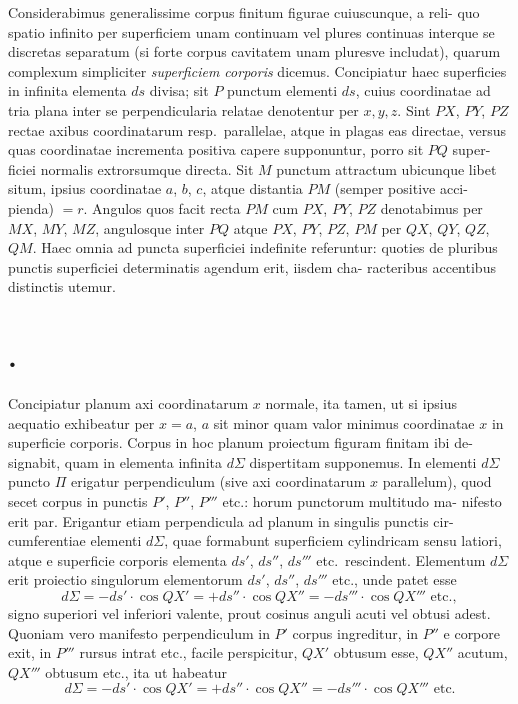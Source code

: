 \documentclass[12pt,a4paper]{article}
\theoremstyle{gauss}
\begin{document}
Considerabimus generalissime corpus finitum figurae cuiuscunque, a reli-
quo spatio infinito per superficiem unam continuam vel plures continuas interque
se discretas separatum (si forte corpus cavitatem unam pluresve includat), quarum
complexum simpliciter \emph{superficiem corporis} dicemus. Concipiatur haec superficies
in infinita elementa $ds$ divisa; sit $P$ punctum elementi $ds$, cuius coordinatae ad
tria plana inter se perpendicularia relatae denotentur per $x,y,z$. Sint $PX$, $PY$, $PZ$
rectae axibus coordinatarum resp.~parallelae, atque in plagas eas directae, versus
quas coordinatae incrementa positiva capere supponuntur, porro sit $PQ$ super-
ficiei normalis extrorsumque directa. Sit $M$ punctum attractum ubicunque libet
situm, ipsius coordinatae $a$, $b$, $c$, atque distantia $PM$ (semper positive acci-
pienda) $=r$. Angulos quos facit recta $PM$ cum $PX$, $PY$, $PZ$ denotabimus
per $MX$, $MY$, $MZ$, angulosque inter $PQ$ atque $PX$, $PY$, $PZ$, $PM$ per
$QX$, $QY$, $QZ$, $QM$. Haec omnia ad puncta superficiei indefinite referuntur:
quoties de pluribus punctis superficiei determinatis agendum erit, iisdem cha-
racteribus accentibus distinctis utemur.

\section*{%
%
\thesection.}

Concipiatur planum axi coordinatarum $x$ normale, ita tamen, ut si ipsius
aequatio exhibeatur per $x=a$, $a$ sit minor quam valor minimus coordinatae $x$
in superficie corporis. Corpus in hoc planum proiectum figuram finitam ibi de-
signabit, quam in elementa infinita $d\Sigma$ dispertitam supponemus. In elementi
$d\Sigma$ puncto $\Pi$ erigatur perpendiculum (sive axi coordinatarum $x$ parallelum),
quod secet corpus in punctis $P'$, $P''$, $P'''$ etc.: horum punctorum multitudo ma-
nifesto erit par. Erigantur etiam perpendicula ad planum in singulis punctis cir-
cumferentiae elementi $d\Sigma$, quae formabunt superficiem cylindricam sensu latiori,
atque e superficie corporis elementa $ds'$, $ds''$, $ds'''$ etc.~rescindent. Elementum
$d\Sigma$ erit proiectio singulorum elementorum $ds'$, $ds''$, $ds'''$ etc., unde patet esse
\[
d\Sigma = -ds'\cdot\cos QX' = +ds''\cdot\cos QX'' = -ds'''\cdot\cos QX''' \text{ etc.},
\]
signo superiori vel inferiori valente, prout cosinus anguli acuti vel obtusi adest. Quoniam vero
manifesto perpendiculum in $P'$ corpus ingreditur, in $P''$ e corpore exit, in $P'''$
rursus intrat etc., facile perspicitur, $QX'$ obtusum esse, $QX''$ acutum, $QX'''$
obtusum etc., ita ut habeatur
\[
d\Sigma = -ds'\cdot\cos QX' = +ds''\cdot\cos QX'' = -ds'''\cdot\cos QX''' \text{ etc.}
\]
\end{document}

